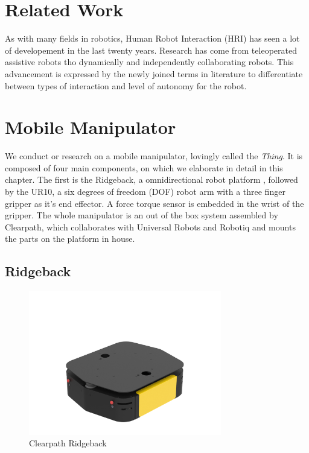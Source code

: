 \chapter{Related Work}
As with many fields in robotics, Human Robot Interaction (HRI) has seen a lot of developement in the last twenty years. Research has come from teleoperated assistive robots tho dynamically and independently collaborating robots. This advancement is expressed by the newly joined terms in literature to differentiate between types of interaction and level of autonomy for the robot.

\chapter{Mobile Manipulator}
We conduct or research on a mobile manipulator, lovingly called the \emph{Thing}. It is composed of four main components, on which we elaborate in detail in this chapter. The first is the Ridgeback, a omnidirectional robot platform , followed by the UR10, a six degrees of freedom (DOF) robot arm with a three finger gripper as it's end effector. A force torque sensor is embedded in the wrist of the gripper. The whole manipulator is an out of the box system assembled by Clearpath, which collaborates with Universal Robots and Robotiq and mounts the parts on the platform in house.

\section{Ridgeback}

\begin{figure}
   \centering
   \includegraphics[width=0.75\textwidth]{images/ridgeback.png}
   \caption{Clearpath Ridgeback}
   \label{pics:ridgeback}
\end{figure}

